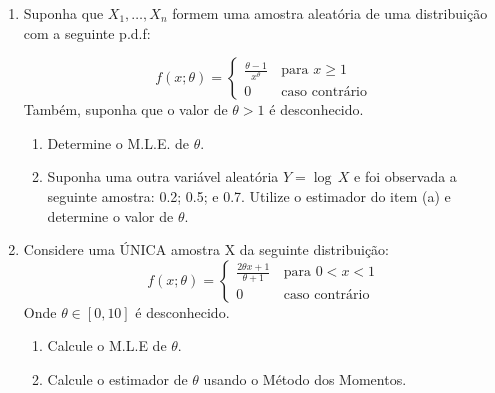 \documentclass[11pt, a4paper]{article}
\begin{document}
\begin{enumerate}

\item Suponha que $X_1, \dots , X_n$ formem uma amostra aleatória de uma distribuição com a seguinte p.d.f:

\[ 
f(x;\theta) = 
\begin{cases}\frac{\theta-1}{x^{\theta}} &\, \text{para } x \geq 1\\
0 &\, \text{caso contrário}
\end{cases}
\]
Também, suponha que o valor de $\theta > 1$ é desconhecido.

\begin{enumerate}
 
\item Determine o M.L.E. de $\theta$.
\vspace{4cm}
\item Suponha uma outra variável aleatória $Y = \log \, X $ e foi observada a seguinte amostra: 0.2; 0.5; e 0.7. Utilize o estimador do item (a) e determine o valor de $\theta$.
\vspace{4cm}
\end{enumerate}

\item Considere uma ÚNICA amostra X da seguinte distribuição:
\[ 
f(x;\theta) = 
\begin{cases}\frac{2\theta x + 1}{\theta + 1} &\, \text{para } 0 < x < 1\\
0 &\, \text{caso contrário}
\end{cases}
\]
Onde $\theta \in [0, 10]$ é desconhecido.

\begin{enumerate}
\item Calcule o M.L.E de $\theta$.

\vspace{4cm}

\item Calcule o estimador de $\theta$ usando o Método dos Momentos.
\vspace{4cm}

\end{enumerate}

\end{enumerate}
\end{document}
